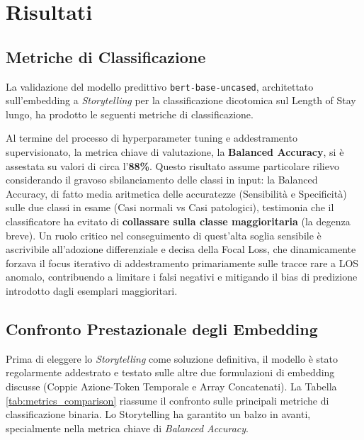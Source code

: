 
\chapter{Risultati}
\label{ch:risultati}

\section{Metriche di Classificazione}
La validazione del modello predittivo \texttt{bert-base-uncased}, architettato sull'embedding a \textit{Storytelling} per la classificazione dicotomica sul Length of Stay lungo, ha prodotto le seguenti metriche di classificazione.

Al termine del processo di hyperparameter tuning e addestramento supervisionato, la metrica chiave di valutazione, la \textbf{Balanced Accuracy}, si è assestata su valori di circa l'\textbf{88\%}. Questo risultato assume particolare rilievo considerando il gravoso sbilanciamento delle classi in input: la Balanced Accuracy, di fatto media aritmetica delle accuratezze (Sensibilità e Specificità) sulle due classi in esame (Casi normali vs Casi patologici), testimonia che il classificatore ha evitato di \textbf{collassare sulla classe maggioritaria} (la degenza breve). Un ruolo critico nel conseguimento di quest'alta soglia sensibile è ascrivibile all'adozione differenziale e decisa della Focal Loss, che dinamicamente forzava il focus iterativo di addestramento primariamente sulle tracce rare a LOS anomalo, contribuendo a limitare i falsi negativi e mitigando il bias di predizione introdotto dagli esemplari maggioritari.

\section{Confronto Prestazionale degli Embedding}
Prima di eleggere lo \textit{Storytelling} come soluzione definitiva, il modello è stato regolarmente addestrato e testato sulle altre due formulazioni di embedding discusse (Coppie Azione-Token Temporale e Array Concatenati). La Tabella \ref{tab:metrics_comparison} riassume il confronto sulle principali metriche di classificazione binaria. Lo Storytelling ha garantito un balzo in avanti, specialmente nella metrica chiave di \textit{Balanced Accuracy}.

